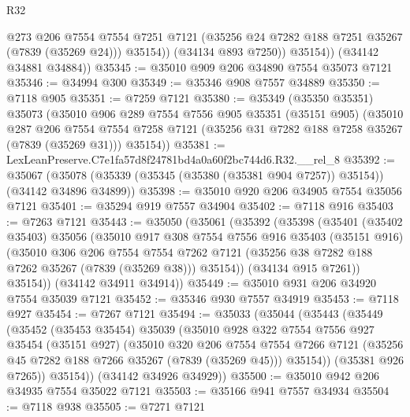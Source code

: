 \begin{lexlean}{R32}
\begin{coremodule}
                @273
                @206
                @7554
                @7554
                @7251
                @7121
                (@35256 @24 @7282 @188 @7251 @35267 (@7839 (@35269 @24)))
                @35154))
            (@34134 @893 @7250))
          @35154))
      (@34142 @34881 @34884))
@35345 := @35010 @909 @206 @34890 @7554 @35073 @7121
@35346 := @34994 @300
@35349 := @35346 @908 @7557 @34889
@35350 := @7118 @905
@35351 := @7259 @7121
@35380 := @35349
    (@35350 @35351)
    @35073
    (@35010
      @906
      @289
      @7554
      @7556
      @905
      @35351
      (@35151 @905)
      (@35010
        @287
        @206
        @7554
        @7554
        @7258
        @7121
        (@35256 @31 @7282 @188 @7258 @35267 (@7839 (@35269 @31)))
        @35154))
@35381 := LexLeanPreserve.C7e1fa57d8f24781bd4a0a60f2bc744d6.R32.__rel_8
@35392 := @35067
    (@35078 (@35339 (@35345 (@35380 (@35381 @904 @7257)) @35154)) (@34142 @34896 @34899))
@35398 := @35010 @920 @206 @34905 @7554 @35056 @7121
@35401 := @35294 @919 @7557 @34904
@35402 := @7118 @916
@35403 := @7263 @7121
@35443 := @35050
    (@35061
      (@35392
        (@35398
          (@35401
            (@35402 @35403)
            @35056
            (@35010
              @917
              @308
              @7554
              @7556
              @916
              @35403
              (@35151 @916)
              (@35010
                @306
                @206
                @7554
                @7554
                @7262
                @7121
                (@35256 @38 @7282 @188 @7262 @35267 (@7839 (@35269 @38)))
                @35154))
            (@34134 @915 @7261))
          @35154))
      (@34142 @34911 @34914))
@35449 := @35010 @931 @206 @34920 @7554 @35039 @7121
@35452 := @35346 @930 @7557 @34919
@35453 := @7118 @927
@35454 := @7267 @7121
@35494 := @35033
    (@35044
      (@35443
        (@35449
          (@35452
            (@35453 @35454)
            @35039
            (@35010
              @928
              @322
              @7554
              @7556
              @927
              @35454
              (@35151 @927)
              (@35010
                @320
                @206
                @7554
                @7554
                @7266
                @7121
                (@35256 @45 @7282 @188 @7266 @35267 (@7839 (@35269 @45)))
                @35154))
            (@35381 @926 @7265))
          @35154))
      (@34142 @34926 @34929))
@35500 := @35010 @942 @206 @34935 @7554 @35022 @7121
@35503 := @35166 @941 @7557 @34934
@35504 := @7118 @938
@35505 := @7271 @7121

\end{coremodule}
\end{lexlean}
